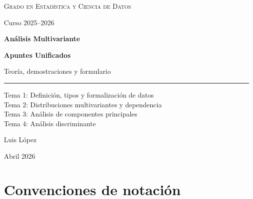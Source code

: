 \documentclass[12pt, a4paper]{article}
\theoremstyle{plain}
\theoremstyle{definition}
\theoremstyle{remark}
\begin{document}
\hypersetup{pageanchor=false}
\begin{titlepage}
  \thispagestyle{empty}
  \centering
  \vspace*{2.4cm}

  {\Large\scshape Grado en Estadística y Ciencia de Datos\par}
  \vspace{0.25cm}
  {\normalsize Curso 2025--2026\par}

  \vspace{1.35cm}
  {\Huge\bfseries Análisis Multivariante\par}
  \vspace{0.25cm}
  {\Large\bfseries Apuntes Unificados\par}
  \vspace{0.55cm}
  {\normalsize Teoría, demostraciones y formulario\par}

  \vspace{1.0cm}
  \rule{0.54\linewidth}{0.6pt}
  \vspace{0.95cm}

  \begin{minipage}{0.78\linewidth}
    \centering
    \normalsize
    Tema 1: Definición, tipos y formalización de datos\\
    Tema 2: Distribuciones multivariantes y dependencia\\
    Tema 3: Análisis de componentes principales\\
    Tema 4: Análisis discriminante
  \end{minipage}

  \vfill
  {\normalsize Luis López\par}
  \vspace{0.15cm}
  {\small Abril 2026\par}
\end{titlepage}
\hypersetup{pageanchor=true}

\tableofcontents

\section*{Convenciones de notación}
\end{document}
